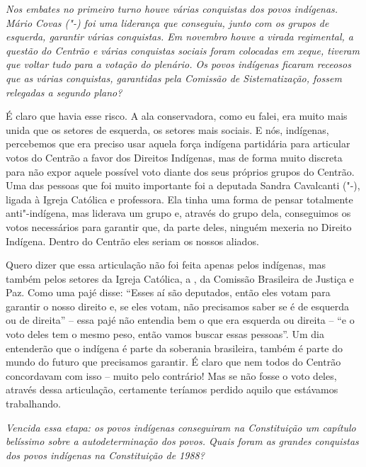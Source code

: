 \medskip

\noindent\emph{Nos embates no primeiro turno houve várias conquistas dos povos
indígenas. Mário Covas ("-) foi uma liderança que conseguiu, junto
com os grupos de esquerda, garantir várias conquistas. Em novembro houve
a virada regimental, a questão do Centrão e várias conquistas sociais
foram colocadas em xeque, tiveram que voltar tudo para a votação do
plenário. Os povos indígenas ficaram receosos que as várias conquistas,
garantidas pela Comissão de Sistematização, fossem relegadas a
segundo plano?}

É claro que havia esse risco. A ala conservadora, como
eu falei, era muito mais unida que os setores de esquerda, os
setores mais sociais. E nós, indígenas, percebemos que era preciso usar
aquela força indígena partidária para articular votos do Centrão a favor
dos Direitos Indígenas, mas de forma muito discreta para não expor
aquele possível voto diante dos seus próprios grupos do Centrão. Uma das
pessoas que foi muito importante foi a deputada Sandra Cavalcanti
("-), ligada à Igreja Católica e professora. Ela tinha uma forma de
pensar totalmente anti"-indígena, mas liderava um grupo e, através do
grupo dela, conseguimos os votos necessários para garantir que, da parte
deles, ninguém mexeria no Direito Indígena. Dentro do Centrão eles
seriam os nossos aliados.

Quero dizer que essa articulação não foi feita apenas pelos indígenas,
mas também pelos setores da Igreja Católica, a , da Comissão
Brasileira de Justiça e Paz. Como uma pajé disse: ``Esses aí são
deputados, então eles votam para garantir o nosso direito e, se eles
votam, não precisamos saber se é de esquerda ou de direita'' -- essa
pajé não entendia bem o que era esquerda ou direita -- ``e o voto deles
tem o mesmo peso, então vamos buscar essas pessoas''. Um dia entenderão
que o indígena é parte da soberania brasileira, também é parte do mundo
do futuro que precisamos garantir. É claro que nem todos do Centrão
concordavam com isso -- muito pelo contrário! Mas se não fosse o voto
deles, através dessa articulação, certamente teríamos perdido aquilo que
estávamos trabalhando.

\medskip

\noindent\emph{Vencida essa etapa: os povos indígenas conseguiram na
Constituição um capítulo belíssimo sobre a autodeterminação dos povos.
Quais foram as grandes conquistas dos povos indígenas na Constituição de
1988?}

